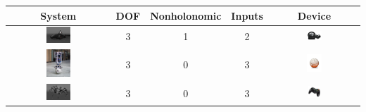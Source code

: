 \begin{table}[H]
\begin{center}
 \begin{tabular}{MMMMM}
 \hline
 System & DOF & Non\-holonomic & Inputs & Device \\ 
  \hline \hline 
     \includegraphics[width = 0.25\textwidth]{amz.jpg}
   & 	3 & 1  & 2 & \includegraphics[width = 0.18\textwidth]{steeringwheel.jpg} \\
  \hline
    \includegraphics[width = 0.25\textwidth]{rezero.jpg}
   & 	3 & 0  & 3 & \includegraphics[width = 0.18\textwidth]{HMI/qgo_sphere_cut.jpg} \\
  \hline
    \includegraphics[width = 0.25\textwidth]{arac.jpg}
   & 	3 & 0  & 3 & \includegraphics[width = 0.14\textwidth]{gamepad.jpg} \\

\end{tabular}
\end{center}
\end{table}
